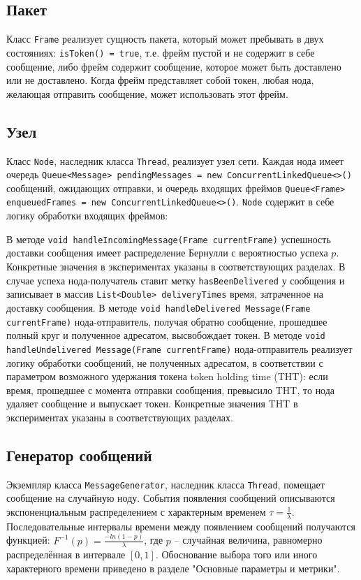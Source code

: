 \documentclass[12pt]{article}
\begin{document}
\subsection{Пакет}
Класс \lstinline|Frame| реализует сущность пакета, который может пребывать в двух состояниях: \lstinline|isToken() = true|, т.е. фрейм пустой и не содержит в себе сообщение, либо фрейм содержит сообщение, которое может быть доставлено или не доставлено. Когда фрейм представляет собой токен, любая нода, желающая отправить сообщение, может использовать этот фрейм.

\subsection{Узел}
Класс \lstinline|Node|, наследник класса \lstinline|Thread|, реализует узел сети. Каждая нода имеет очередь \lstinline|Queue<Message> pendingMessages = new ConcurrentLinkedQueue<>()| сообщений, ожидающих отправки, и очередь входящих фреймов \lstinline|Queue<Frame> enqueuedFrames = new ConcurrentLinkedQueue<>()|. \lstinline|Node| содержит в себе логику обработки входящих фреймов:



В методе \lstinline|void handleIncomingMessage(Frame currentFrame)| успешность доставки сообщения имеет распределение Бернулли с вероятностью успеха $p$. Конкретные значения в экспериментах указаны в соответствующих разделах. В случае успеха нода-получатель ставит метку \lstinline|hasBeenDelivered| у сообщения и записывает в массив \lstinline|List<Double> deliveryTimes| время, затраченное на доставку сообщения. В методе \lstinline|void handleDelivered Message(Frame currentFrame)| нода-отправитель, получая обратно сообщение, прошедшее полный круг и полученное адресатом, высвобождает токен. В методе \lstinline|void handleUndelivered Message(Frame currentFrame)| нода-отправитель реализует логику обработки сообщений, не полученных адресатом, в соответствии с параметром возможного удержания токена token holding time (THT): если время, прошедшее с момента отправки сообщения, превысило THT, то нода удаляет сообщение и выпускает токен. Конкретные значения THT в экспериментах указаны в соответствующих разделах.

\subsection{Генератор сообщений}
Экземпляр класса \lstinline|MessageGenerator|, наследник класса \lstinline|Thread|, помещает сообщение на случайную ноду. События появления сообщений описываются экспоненциальным распределением с характерным временем $\tau=\frac{1}{\lambda}$. Последовательные интервалы времени между появлением сообщений получаются функцией: $F^{-1}(p) = \frac{-ln(1-p)}{\lambda}$, где $p$ – случайная величина, равномерно распределённая в интервале $[0, 1]$. Обоснование выбора того или иного характерного времени приведено в разделе "Основные параметры и метрики".
\end{document}
